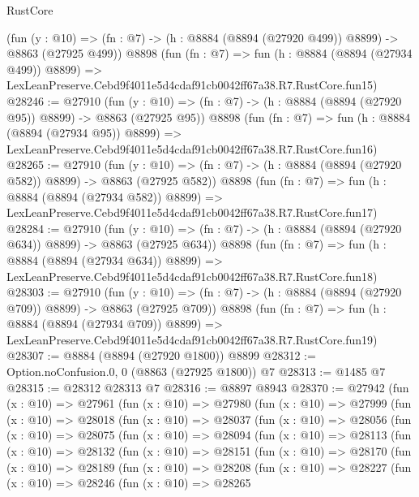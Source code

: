 \begin{lexlean}{RustCore}
\begin{coremodule}
    (fun (y : @10) => (fn : @7) -> (h : @8884 (@8894 (@27920 @499)) @8899) -> @8863 (@27925 @499))
    @8898
    (fun (fn : @7) =>
    fun (h : @8884 (@8894 (@27934 @499)) @8899) =>
    LexLeanPreserve.Cebd9f4011e5d4cdaf91cb0042ff67a38.R7.RustCore.fun15)
@28246 := @27910
    (fun (y : @10) => (fn : @7) -> (h : @8884 (@8894 (@27920 @95)) @8899) -> @8863 (@27925 @95))
    @8898
    (fun (fn : @7) =>
    fun (h : @8884 (@8894 (@27934 @95)) @8899) =>
    LexLeanPreserve.Cebd9f4011e5d4cdaf91cb0042ff67a38.R7.RustCore.fun16)
@28265 := @27910
    (fun (y : @10) => (fn : @7) -> (h : @8884 (@8894 (@27920 @582)) @8899) -> @8863 (@27925 @582))
    @8898
    (fun (fn : @7) =>
    fun (h : @8884 (@8894 (@27934 @582)) @8899) =>
    LexLeanPreserve.Cebd9f4011e5d4cdaf91cb0042ff67a38.R7.RustCore.fun17)
@28284 := @27910
    (fun (y : @10) => (fn : @7) -> (h : @8884 (@8894 (@27920 @634)) @8899) -> @8863 (@27925 @634))
    @8898
    (fun (fn : @7) =>
    fun (h : @8884 (@8894 (@27934 @634)) @8899) =>
    LexLeanPreserve.Cebd9f4011e5d4cdaf91cb0042ff67a38.R7.RustCore.fun18)
@28303 := @27910
    (fun (y : @10) => (fn : @7) -> (h : @8884 (@8894 (@27920 @709)) @8899) -> @8863 (@27925 @709))
    @8898
    (fun (fn : @7) =>
    fun (h : @8884 (@8894 (@27934 @709)) @8899) =>
    LexLeanPreserve.Cebd9f4011e5d4cdaf91cb0042ff67a38.R7.RustCore.fun19)
@28307 := @8884 (@8894 (@27920 @1800)) @8899
@28312 := Option.noConfusion.{0, 0} (@8863 (@27925 @1800)) @7
@28313 := @1485 @7
@28315 := @28312 @28313 @7
@28316 := @8897 @8943
@28370 := @27942
    (fun (x : @10) =>
    @27961
      (fun (x : @10) =>
      @27980
        (fun (x : @10) =>
        @27999
          (fun (x : @10) =>
          @28018
            (fun (x : @10) =>
            @28037
              (fun (x : @10) =>
              @28056
                (fun (x : @10) =>
                @28075
                  (fun (x : @10) =>
                  @28094
                    (fun (x : @10) =>
                    @28113
                      (fun (x : @10) =>
                      @28132
                        (fun (x : @10) =>
                        @28151
                          (fun (x : @10) =>
                          @28170
                            (fun (x : @10) =>
                            @28189
                              (fun (x : @10) =>
                              @28208
                                (fun (x : @10) =>
                                @28227
                                  (fun (x : @10) =>
                                  @28246
                                    (fun (x : @10) =>
                                    @28265

\end{coremodule}
\end{lexlean}
